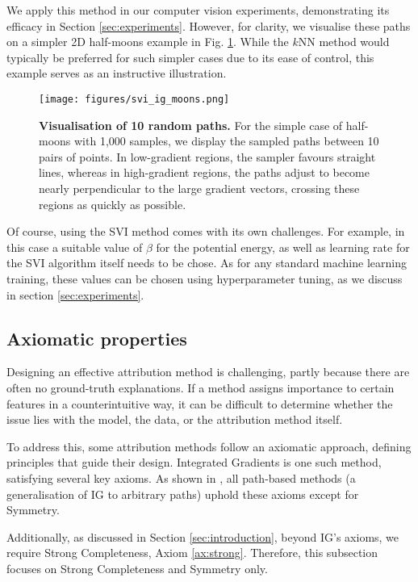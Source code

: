 We apply this method in our computer vision experiments, demonstrating its efficacy in Section \ref{sec:experiments}. However, for clarity, we visualise these paths on a simpler 2D half-moons example in Fig. \ref{fig:svi_moons}. While the $k$NN method would typically be preferred for such simpler cases due to its ease of control, this example serves as an instructive illustration.

\begin{figure}[ht]
	\vskip 0.2in
	\begin{center}
		\centerline{\texttt{[image: figures/svi\_ig\_moons.png]}}
		\caption{\textbf{Visualisation of 10 random paths.} For the simple case of half-moons with 1,000 samples, we display the sampled paths between 10 pairs of points. In low-gradient regions, the sampler favours straight lines, whereas in high-gradient regions, the paths adjust to become nearly perpendicular to the large gradient vectors, crossing these regions as quickly as possible.}
		\label{fig:svi_moons}
	\end{center}
	\vskip -0.2in
\end{figure}

Of course, using the SVI method comes with its own challenges. For example, in this case a suitable value of $\beta$ for the potential energy, as well as learning rate for the SVI algorithm itself needs to be chose. As for any standard machine learning training, these values can be chosen using hyperparameter tuning, as we discuss in section \ref{sec:experiments}.

\subsection{Axiomatic properties}

Designing an effective attribution method is challenging, partly because there are often no ground-truth explanations. If a method assigns importance to certain features in a counterintuitive way, it can be difficult to determine whether the issue lies with the model, the data, or the attribution method itself.

To address this, some attribution methods follow an axiomatic approach, defining principles that guide their design. Integrated Gradients is one such method, satisfying several key axioms. As shown in \citet{sundararajan2017axiomatic}, all path-based methods (a generalisation of IG to arbitrary paths) uphold these axioms except for Symmetry.

Additionally, as discussed in Section \ref{sec:introduction}, beyond IG's axioms, we require Strong Completeness, Axiom \ref{ax:strong}. Therefore, this subsection focuses on Strong Completeness and Symmetry only.

